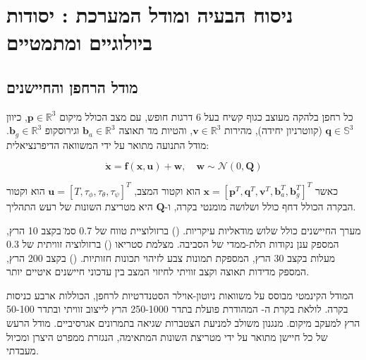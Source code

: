 

\section{ניסוח הבעיה ומודל המערכת : יסודות ביולוגיים ומתמטיים}
\label{sec:problem_formulation}

\subsection{מודל הרחפן והחיישנים}
\label{sec:drone_model}

כל רחפן בלהקה מעוצב כגוף קשיח בעל 6 דרגות חופש, עם מצב הכולל מיקום $\mathbf{p} \in \mathbb{R}^{3}$, כיוון $\mathbf{q} \in \mathbb{S}^{3}$ (קווטרניון יחידה), מהירות $\mathbf{v} \in \mathbb{R}^{3}$, והטיות מד תאוצה $\mathbf{b}_{a} \in \mathbb{R}^{3}$ וגירוסקופ $\mathbf{b}_{g} \in \mathbb{R}^{3}$. מודל התנועה מתואר על ידי המשוואה הדיפרנציאלית:

\begin{equation}
\dot{\mathbf{x}} = \mathbf{f}(\mathbf{x}, \mathbf{u}) + \mathbf{w}, \quad \mathbf{w} \sim \mathcal{N}(0, \mathbf{Q})
\label{eq:drone_dynamics}
\end{equation}

כאשר $\mathbf{x} = [\mathbf{p}^{T}, \mathbf{q}^{T}, \mathbf{v}^{T}, \mathbf{b}_{a}^{T}, \mathbf{b}_{g}^{T}]^{T}$ הוא וקטור המצב, $\mathbf{u} = [T, \tau_{\phi}, \tau_{\theta}, \tau_{\psi}]^{T}$ הוא וקטור הבקרה הכולל דחף כולל ושלושה מומנטי בקרה, ו-$\mathbf{Q}$ היא מטריצת השונות של רעש התהליך.

מערך החיישנים כולל שלוש מודאליות עיקריות.  () ברזולוציית טווח של 0.7 ס\"מ בקצב 10 הרץ, המספק ענן נקודות תלת-ממדי של הסביבה. מצלמת סטריאו () ברזולוציה זוויתית של 0.3 מעלות בקצב 30 הרץ, המספקת תמונות צבע לזיהוי תכונות חזותיות.  () בקצב 200 הרץ, המספק מדידות תאוצה וקצב זוויתי לחיזוי המצב בין עדכוני חיישנים איטיים יותר.

המודל הקינמטי מבוסס על משוואות ניוטון-אוילר הסטנדרטיות לרחפן, הכוללות ארבע כניסות בקרה. לולאת בקרת ה- המהודרת פועלת בתדר 250-1000 הרץ לייצוב זוויתי ובתדר 50-100 הרץ למעקב מיקום. מנגנון  משולב למניעת הצטברות שגיאה בתמרונים אגרסיביים. מודל הרעש של כל חיישן מתואר על ידי מטריצת השונות המתאימה, הנגזרת ממפרט היצרן ומכיול מעבדתי.


